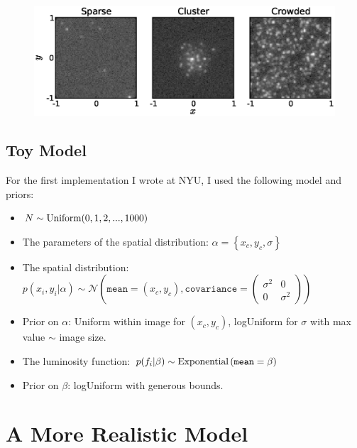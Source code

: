 \documentclass[letterpaper, 11pt]{article}
\begin{document}
\begin{figure}
\hspace{-1cm}
\includegraphics{Figures/test_cases.eps}
\end{figure}

\subsection{Toy Model}
For the first implementation I wrote at NYU, I used the following model and
priors:
\begin{itemize}
\item $N \sim \textnormal{Uniform}(0, 1, 2, ..., 1000)$ \\
\item The parameters of the spatial
distribution: $\alpha = \left\{x_c, y_c, \sigma\right\}$ \\
\item The spatial distribution: $p(x_i, y_i | \alpha)\sim\mathcal{N}\left(
\texttt{mean}=(x_c, y_c), \texttt{covariance}=
\left(\begin{array}{cc}\sigma^2 & 0 \\ 0 & \sigma^2\end{array}\right)\right)$ \\
\item Prior on $\alpha$: Uniform within image for $(x_c, y_c)$, logUniform for
$\sigma$ with max value $\sim$ image size.
\item The luminosity function: $p(f_i | \beta) \sim
\textnormal{Exponential}\left(\texttt{mean}=\beta\right)$ \\
\item Prior on $\beta$: logUniform with generous bounds.
\end{itemize}



\section{A More Realistic Model}
\citep{2008ApJ...682..874K}
\end{document}
